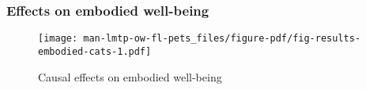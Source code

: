 \documentclass[
  singlecolumn,
  9pt]{article}
\begin{document}
\newpage{}

\subsubsection{Effects on embodied
well-being}\label{effects-on-embodied-well-being}

\begin{figure}

{\centering \texttt{[image: man-lmtp-ow-fl-pets\_files/figure-pdf/fig-results-embodied-cats-1.pdf]}

}

\caption{\label{fig-results-embodied-cats}Causal effects on embodied
well-being}

\end{figure}

\newpage{}
\end{document}
